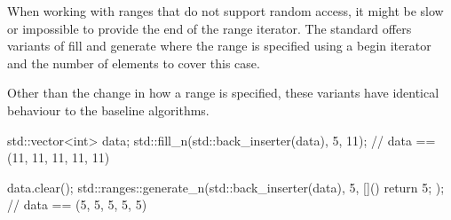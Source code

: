 When working with ranges that do not support random access, it might be slow or impossible to provide the end of the range iterator. The standard offers variants of fill and generate where the range is specified using a begin iterator and the number of elements to cover this case.




Other than the change in how a range is specified, these variants have identical behaviour to the baseline algorithms.

\begin{box-note}
\begin{cppcode}
std::vector<int> data;
std::fill_n(std::back_inserter(data), 5, 11);
// data == (11, 11, 11, 11, 11)

data.clear();
std::ranges::generate_n(std::back_inserter(data), 5, []() { return 5; });
// data == (5, 5, 5, 5, 5)
\end{cppcode}
\end{box-note}
